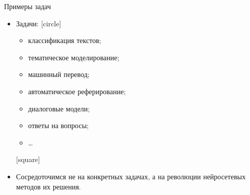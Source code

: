 \begin{frame}[c]{Примеры задач}

\begin{itemize}
	[square]
	\item Задачи:
	[circle]
	\begin{itemize}
		\item классификация текстов;
		\item тематическое моделирование;
		\item машинный перевод;
		\item автоматическое реферирование;
		\item диалоговые модели;
		\item ответы на вопросы;
		\item \dots
	\end{itemize}
	[square]
	\item Сосредоточимся не на конкретных задачах, а на революции нейросетевых методов их решения.
\end{itemize}


\end{frame}